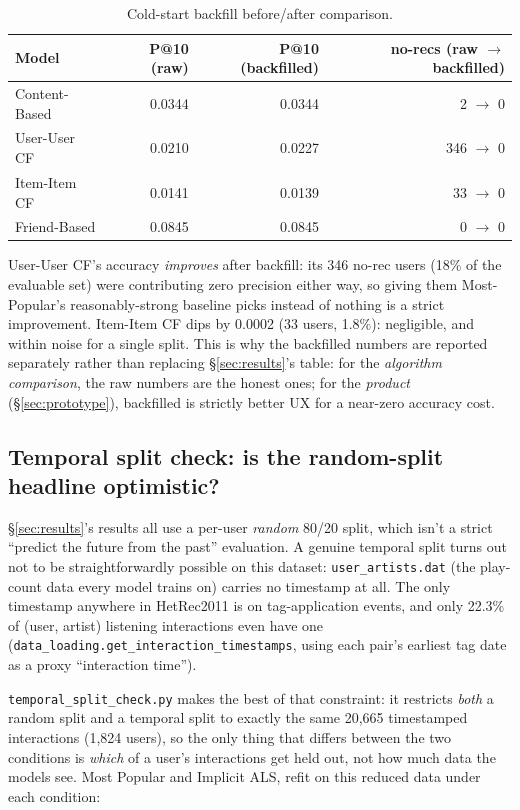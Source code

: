 \documentclass[11pt,a4paper]{article}
\newcommand{\code}[1]{\texttt{#1}}
\newcommand{\secref}[1]{\S\ref{#1}}
\begin{document}
\begin{table}[!htbp]
\centering
\begin{tabular}{lrrr}
\toprule
Model & P@10 (raw) & P@10 (backfilled) & no-recs (raw $\to$ backfilled) \\
\midrule
Content-Based & 0.0344 & 0.0344 & 2 $\to$ 0 \\
User-User CF & 0.0210 & 0.0227 & 346 $\to$ 0 \\
Item-Item CF & 0.0141 & 0.0139 & 33 $\to$ 0 \\
Friend-Based & 0.0845 & 0.0845 & 0 $\to$ 0 \\
\bottomrule
\end{tabular}
\caption{Cold-start backfill before/after comparison.}
\end{table}

User-User CF's accuracy \emph{improves} after backfill: its 346 no-rec users (18\% of the evaluable set) were contributing zero precision either way, so giving them Most-Popular's reasonably-strong baseline picks instead of nothing is a strict improvement. Item-Item CF dips by 0.0002 (33 users, 1.8\%): negligible, and within noise for a single split. This is why the backfilled numbers are reported separately rather than replacing \secref{sec:results}'s table: for the \emph{algorithm comparison}, the raw numbers are the honest ones; for the \emph{product} (\secref{sec:prototype}), backfilled is strictly better UX for a near-zero accuracy cost.

\subsection{Temporal split check: is the random-split headline optimistic?}

\secref{sec:results}'s results all use a per-user \emph{random} 80/20 split, which isn't a strict ``predict the future from the past'' evaluation. A genuine temporal split turns out not to be straightforwardly possible on this dataset: \code{user\_artists.dat} (the play-count data every model trains on) carries no timestamp at all. The only timestamp anywhere in HetRec2011 is on tag-application events, and only 22.3\% of (user, artist) listening interactions even have one (\code{data\_loading.get\_interaction\_timestamps}, using each pair's earliest tag date as a proxy ``interaction time'').

\code{temporal\_split\_check.py} makes the best of that constraint: it restricts \emph{both} a random split and a temporal split to exactly the same 20{,}665 timestamped interactions (1{,}824 users), so the only thing that differs between the two conditions is \emph{which} of a user's interactions get held out, not how much data the models see. Most Popular and Implicit ALS, refit on this reduced data under each condition:
\end{document}
